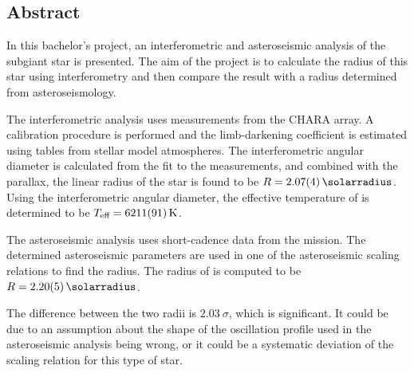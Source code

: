 \subsection*{Abstract}
{\small In this bachelor's project, an interferometric and asteroseismic analysis of the subgiant star \mystar is presented. The aim of the project is to calculate the radius of this star using interferometry and then compare the result with a radius determined from asteroseismology. 

The interferometric analysis uses measurements from the CHARA array. A calibration procedure is performed and the limb-darkening coefficient is estimated using tables from stellar model atmospheres. The interferometric angular diameter is calculated from the fit to the measurements, and combined with the \hipparcos parallax, the linear radius of the star is found to be $R = \SI{2.07 \pm 0.04}{\solarradius}$. Using the interferometric angular diameter, the effective temperature of \mystar is determined to be $\teff = \SI{6211 \pm 91}{\kelvin}$.

The asteroseismic analysis uses short-cadence data from the \kepler mission. The determined asteroseismic parameters are used in one of the asteroseismic scaling relations to find the radius. The radius of \mystar is computed to be 
$R = \SI{2.20 \pm 0.05}{\solarradius}$.

The difference between the two radii is $\SI{2.03}{\sigma}$, which is significant.
It could be due to an assumption about the shape of the oscillation profile used in the asteroseismic analysis being wrong,
or it could be a systematic deviation of the scaling relation for this type of star. \par
}
